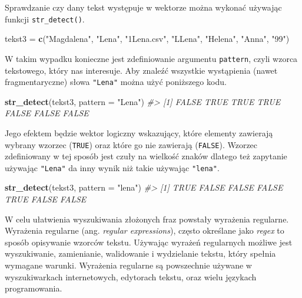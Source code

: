 \documentclass[paper=6in:9in,pagesize=pdftex,headinclude=on,footinclude=on,10pt]{scrbook}
\newenvironment{Shaded}{\begin{snugshade}}{\end{snugshade}}
\newcommand{\CommentTok}[1]{\textcolor[rgb]{0.56,0.35,0.01}{\textit{#1}}}
\newcommand{\DataTypeTok}[1]{\textcolor[rgb]{0.13,0.29,0.53}{#1}}
\newcommand{\KeywordTok}[1]{\textcolor[rgb]{0.13,0.29,0.53}{\textbf{#1}}}
\newcommand{\NormalTok}[1]{#1}
\newcommand{\StringTok}[1]{\textcolor[rgb]{0.31,0.60,0.02}{#1}}
\begin{document}
Sprawdzanie czy dany tekst występuje w wektorze można wykonać używając funkcji \texttt{str\_detect()}.

\begin{Shaded}
\begin{Highlighting}[]
\NormalTok{tekst3 =}\StringTok{ }\KeywordTok{c}\NormalTok{(}\StringTok{"Magdalena"}\NormalTok{, }\StringTok{"Lena"}\NormalTok{, }\StringTok{"1Lena.csv"}\NormalTok{, }\StringTok{"LLena"}\NormalTok{, }\StringTok{"Helena"}\NormalTok{, }\StringTok{"Anna"}\NormalTok{, }\StringTok{"99"}\NormalTok{)}
\end{Highlighting}
\end{Shaded}

W takim wypadku konieczne jest zdefiniowanie argumentu \texttt{pattern}, czyli wzorca tekstowego, który nas interesuje.
Aby znaleźć wszystkie wystąpienia (nawet fragmentaryczne) słowa \texttt{"Lena"} można użyć poniższego kodu.

\begin{Shaded}
\begin{Highlighting}[]
\KeywordTok{str_detect}\NormalTok{(tekst3, }\DataTypeTok{pattern =} \StringTok{"Lena"}\NormalTok{)}
\CommentTok{#> [1] FALSE  TRUE  TRUE  TRUE FALSE FALSE FALSE}
\end{Highlighting}
\end{Shaded}

Jego efektem będzie wektor logiczny wskazujący, które elementy zawierają wybrany wzorzec (\texttt{TRUE}) oraz które go nie zawierają (\texttt{FALSE}).
Wzorzec zdefiniowany w tej sposób jest czuły na wielkość znaków dlatego też zapytanie używając \texttt{"Lena"} da inny wynik niż takie używając \texttt{"lena"}.

\begin{Shaded}
\begin{Highlighting}[]
\KeywordTok{str_detect}\NormalTok{(tekst3, }\DataTypeTok{pattern =} \StringTok{"lena"}\NormalTok{)}
\CommentTok{#> [1]  TRUE FALSE FALSE FALSE  TRUE FALSE FALSE}
\end{Highlighting}
\end{Shaded}

W celu ułatwienia wyszukiwania złożonych fraz powstały wyrażenia regularne.
Wyrażenia regularne (ang. \emph{regular expressions}), często określane jako \emph{regex} to sposób opisywanie wzorców tekstu.
Używając wyrażeń regularnych możliwe jest wyszukiwanie, zamienianie, walidowanie i wydzielanie tekstu, który spełnia wymagane warunki.
Wyrażenia regularne są powszechnie używane w wyszukiwarkach internetowych, edytorach tekstu, oraz wielu językach programowania.
\end{document}
